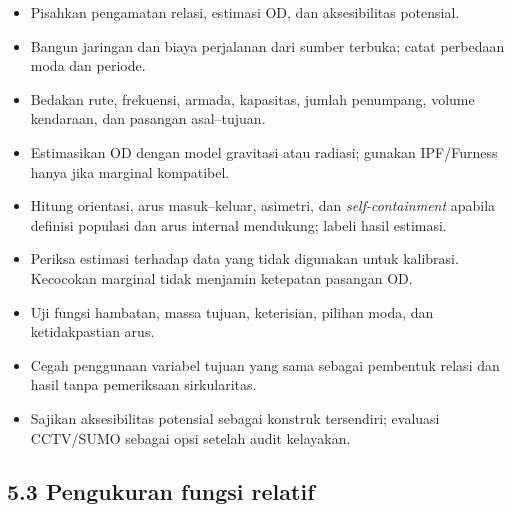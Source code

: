 \documentclass[
  indonesian,
  11pt,
]{article}
\providecommand{\tightlist}{%
  \setlength{\itemsep}{0pt}\setlength{\parskip}{0pt}}
\renewcommand{\tightlist}{%
  \setlength{\itemsep}{0.22em}%
  \setlength{\parskip}{0pt}%
}
\begin{document}
\begin{itemize}
\tightlist
\item[$\square$]
  Pisahkan pengamatan relasi, estimasi OD, dan aksesibilitas potensial.
\item[$\square$]
  Bangun jaringan dan biaya perjalanan dari sumber terbuka; catat
  perbedaan moda dan periode.
\item[$\square$]
  Bedakan rute, frekuensi, armada, kapasitas, jumlah penumpang, volume
  kendaraan, dan pasangan asal--tujuan.
\item[$\square$]
  Estimasikan OD dengan model gravitasi atau radiasi; gunakan
  IPF/Furness hanya jika marginal kompatibel.
\item[$\square$]
  Hitung orientasi, arus masuk--keluar, asimetri, dan
  \emph{self-containment} apabila definisi populasi dan arus internal
  mendukung; labeli hasil estimasi.
\item[$\square$]
  Periksa estimasi terhadap data yang tidak digunakan untuk kalibrasi.
  Kecocokan marginal tidak menjamin ketepatan pasangan OD.
\item[$\square$]
  Uji fungsi hambatan, massa tujuan, keterisian, pilihan moda, dan
  ketidakpastian arus.
\item[$\square$]
  Cegah penggunaan variabel tujuan yang sama sebagai pembentuk relasi
  dan hasil tanpa pemeriksaan sirkularitas.
\item[$\square$]
  Sajikan aksesibilitas potensial sebagai konstruk tersendiri; evaluasi
  CCTV/SUMO sebagai opsi setelah audit kelayakan.
\end{itemize}

\subsection{5.3 Pengukuran fungsi
relatif}\label{pengukuran-fungsi-relatif}
\end{document}
